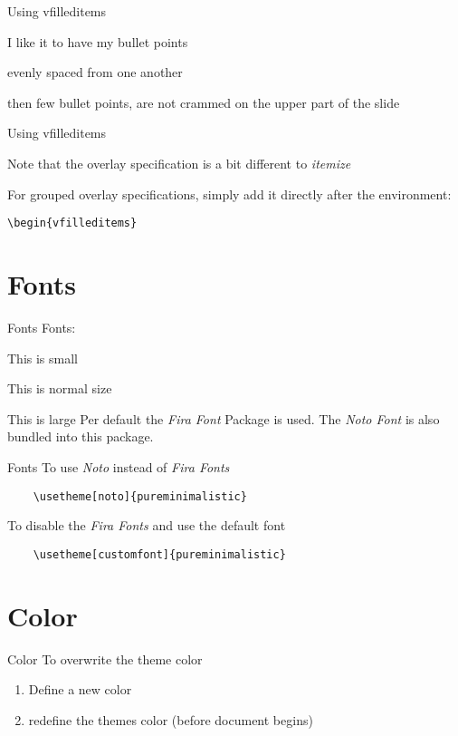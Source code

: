 \documentclass[aspectratio=169]{beamer}                    %
\begin{document}
\begin{frame}{Using vfilleditems}
	\begin{vfilleditems}
		\item I like it to have my bullet points
		\item evenly spaced from one another
		\item then few bullet points, are not crammed on
		the upper part of the slide
	\end{vfilleditems}
\end{frame}

\begin{frame}{Using vfilleditems}
	\begin{vfilleditems}
		\item Note that the overlay specification
		is a bit different to \emph{itemize}
		\item For grouped overlay specifications, simply add it
		directly after the environment:
		\begin{vfilleditems}
			\item \texttt{\textbackslash{}begin\{vfilleditems\}<+->}
		\end{vfilleditems}
	\end{vfilleditems}
\end{frame}


\section{Fonts}
\begin{frame}[fragile]{Fonts}
	Fonts:

	{\small This is small}

	This is normal size

		{\large This is large}
	\vfill
	Per default the \emph{Fira Font} Package is
	used. The \emph{Noto Font} is also bundled into this
	package.
\end{frame}

\begin{frame}[fragile]{Fonts}
	To use \emph{Noto} instead of \emph{Fira Fonts}
	\begin{verbatim}
    \usetheme[noto]{pureminimalistic}
  \end{verbatim}
	\vfill
	To disable the \emph{Fira Fonts} and use the default font
	\begin{verbatim}
    \usetheme[customfont]{pureminimalistic}
  \end{verbatim}
\end{frame}

\section{Color}
\begin{frame}[fragile]{Color}
	To overwrite the theme color
	\begin{enumerate}
		\item Define a new color
		\item redefine the themes color (before document begins)
	\end{enumerate}
\end{frame}
\end{document}

